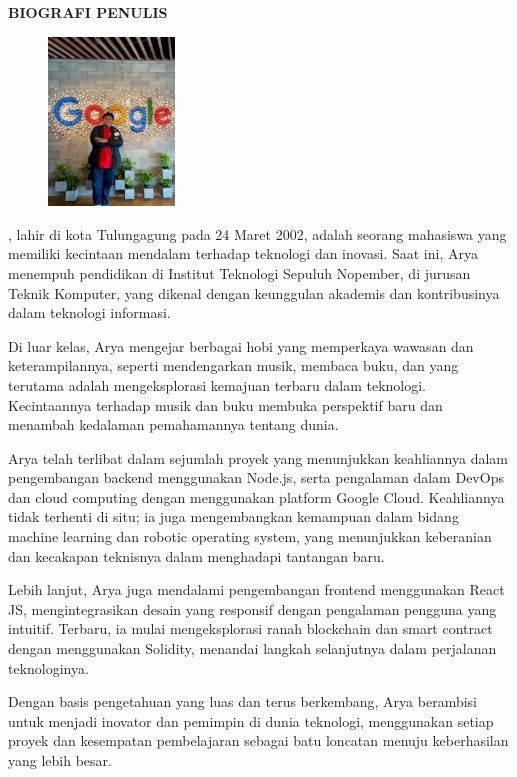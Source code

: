 \begin{center}
  \Large
  \textbf{BIOGRAFI PENULIS}
\end{center}


\vspace{2ex}

\begin{figure}
  \centering
  \vspace{-3ex}
  \includegraphics[width=0.3\textwidth]{gambar/foto_biografi.jpg}
  \vspace{-4ex}
\end{figure}

\name{}, lahir di kota Tulungagung pada 24 Maret 2002, adalah seorang mahasiswa yang memiliki kecintaan mendalam terhadap teknologi dan inovasi. Saat ini, Arya menempuh pendidikan di Institut Teknologi Sepuluh Nopember, di jurusan Teknik Komputer, yang dikenal dengan keunggulan akademis dan kontribusinya dalam teknologi informasi.

Di luar kelas, Arya mengejar berbagai hobi yang memperkaya wawasan dan keterampilannya, seperti mendengarkan musik, membaca buku, dan yang terutama adalah mengeksplorasi kemajuan terbaru dalam teknologi. Kecintaannya terhadap musik dan buku membuka perspektif baru dan menambah kedalaman pemahamannya tentang dunia.

Arya telah terlibat dalam sejumlah proyek yang menunjukkan keahliannya dalam pengembangan backend menggunakan Node.js, serta pengalaman dalam DevOps dan cloud computing dengan menggunakan platform Google Cloud. Keahliannya tidak terhenti di situ; ia juga mengembangkan kemampuan dalam bidang machine learning dan robotic operating system, yang menunjukkan keberanian dan kecakapan teknisnya dalam menghadapi tantangan baru.

Lebih lanjut, Arya juga mendalami pengembangan frontend menggunakan React JS, mengintegrasikan desain yang responsif dengan pengalaman pengguna yang intuitif. Terbaru, ia mulai mengeksplorasi ranah blockchain dan smart contract dengan menggunakan Solidity, menandai langkah selanjutnya dalam perjalanan teknologinya.

Dengan basis pengetahuan yang luas dan terus berkembang, Arya berambisi untuk menjadi inovator dan pemimpin di dunia teknologi, menggunakan setiap proyek dan kesempatan pembelajaran sebagai batu loncatan menuju keberhasilan yang lebih besar.
